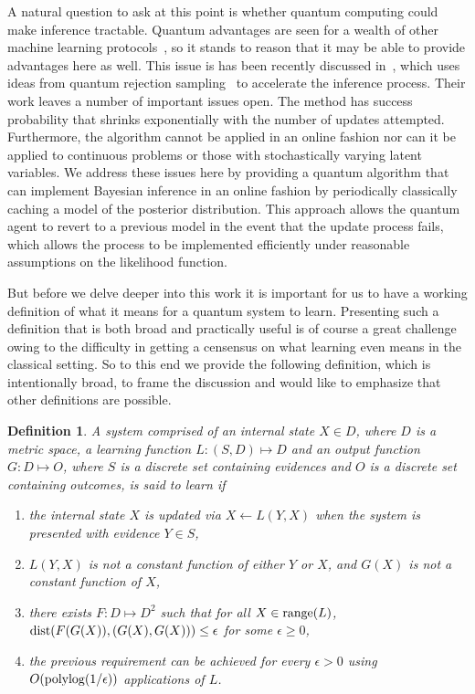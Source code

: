 \documentclass[aps,amsmath,onecolumn,amssymb,notitlepage]{revtex4-1}
\newtheorem{definition}{Definition}
\begin{document}
 A natural question to ask at this point is whether quantum computing could make inference tractable.  Quantum advantages are seen for a wealth of other machine learning protocols~\cite{aimeur2006machine,wiebe_quantum_2014,wiebe2014quantum,lloyd2013quantum,lloyd2014quantum,boixo2015fast}, so it stands to reason that it may be able to provide advantages here as well.  This issue is has been recently discussed in~\cite{LYC14}, which uses ideas from quantum rejection sampling~\cite{HHL09,ORR13} to accelerate the inference process.  Their work leaves a number of important issues open.  The method has success probability that shrinks exponentially with the number of updates attempted.  Furthermore, the algorithm cannot be applied in an online fashion nor can it be applied to continuous problems or those with stochastically varying latent variables.  We address these issues here by providing a quantum algorithm that can implement Bayesian inference in an online fashion by periodically classically caching a model of the posterior distribution.  This approach allows the quantum agent to revert to a previous model in the event that the update process fails, which allows the process to be implemented efficiently under reasonable assumptions on the likelihood function.

But before we delve deeper into this work it is important for us to have a working definition of what it means for a quantum system to learn.  Presenting such a definition that is both broad and practically useful is of course a great challenge owing to the difficulty in getting a censensus on what learning even means in the classical setting.  So to this end we provide the following definition, which is intentionally broad, to frame the discussion and would like to emphasize that other definitions are possible.

\begin{definition}\label{def:1}
A system comprised of an internal state $X\in D$, where $D$ is a metric space, a learning function $L:(S,D)\mapsto D$ and an output function $G:D \mapsto O$, where $S$ is a discrete set containing evidences and $O$ is a discrete set containing outcomes, is said to learn if
\begin{enumerate}
\item the internal state $X$ is updated via $X \leftarrow L(Y,X)$ when the system is presented with evidence $Y\in S$,
\item $L(Y,X)$ is not a constant function of either $Y$ or $X$, and $G(X)$ is not a constant function of $X$,
\item there exists $F: D \mapsto D^2$ such that for all $X\in {\rm range}(L)$, ${\rm dist}(F(G(X)), (G(X),G(X))) \le \epsilon$ for some $\epsilon \ge 0$,
\item the previous requirement can be achieved for every $\epsilon>0$ using $O({\rm polylog}(1/\epsilon))$ applications of $L$.
\end{enumerate}
\end{definition}
\end{document}
